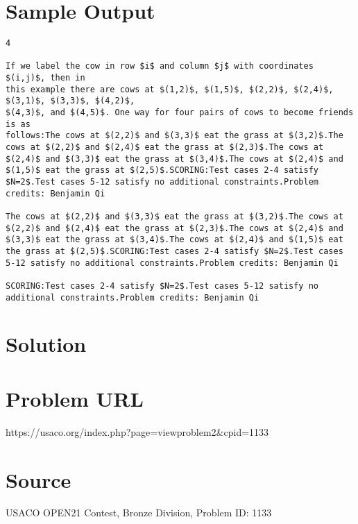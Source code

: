 \documentclass[12pt]{article}
\begin{document}
\section*{Sample Output}
\begin{verbatim}
4

If we label the cow in row $i$ and column $j$ with coordinates $(i,j)$, then in
this example there are cows at $(1,2)$, $(1,5)$, $(2,2)$, $(2,4)$, $(3,1)$, $(3,3)$, $(4,2)$,
$(4,3)$, and $(4,5)$. One way for four pairs of cows to become friends is as
follows:The cows at $(2,2)$ and $(3,3)$ eat the grass at $(3,2)$.The cows at $(2,2)$ and $(2,4)$ eat the grass at $(2,3)$.The cows at $(2,4)$ and $(3,3)$ eat the grass at $(3,4)$.The cows at $(2,4)$ and $(1,5)$ eat the grass at $(2,5)$.SCORING:Test cases 2-4 satisfy $N=2$.Test cases 5-12 satisfy no additional constraints.Problem credits: Benjamin Qi

The cows at $(2,2)$ and $(3,3)$ eat the grass at $(3,2)$.The cows at $(2,2)$ and $(2,4)$ eat the grass at $(2,3)$.The cows at $(2,4)$ and $(3,3)$ eat the grass at $(3,4)$.The cows at $(2,4)$ and $(1,5)$ eat the grass at $(2,5)$.SCORING:Test cases 2-4 satisfy $N=2$.Test cases 5-12 satisfy no additional constraints.Problem credits: Benjamin Qi

SCORING:Test cases 2-4 satisfy $N=2$.Test cases 5-12 satisfy no additional constraints.Problem credits: Benjamin Qi
\end{verbatim}

\section*{Solution}


\section*{Problem URL}
https://usaco.org/index.php?page=viewproblem2&cpid=1133

\section*{Source}
USACO OPEN21 Contest, Bronze Division, Problem ID: 1133
\end{document}
